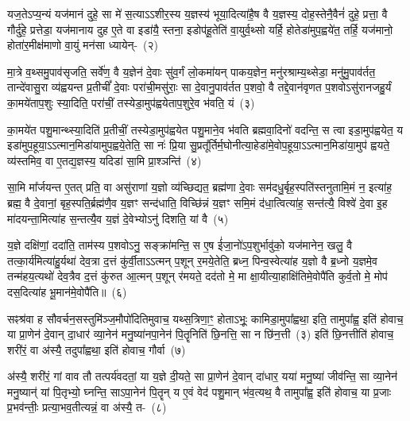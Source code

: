 यज॒ते\-ऽप्य॒न्यं यज॑मानं दुहे॒ सा मे॑ स॒त्या\-ऽऽ\-शीर॒स्य य॒ज्ञस्य॑ भूया॒दित्या॑है॒ष वै य॒ज्ञस्य॒ दोह॒स्तेनै॒वैनं॑ दुहे॒ प्रत्ता॒ वै गौर्दु॑हे॒ प्रत्तेडा॒ यज॑मानाय दुह ए॒ते वा इडा॑यै॒ स्तना॒ इडोप॑हू॒तेति॑ वा॒युर्व॒थ्सो यर्\mbox{}हि॒ होतेडा॑मुप॒ह्वये॑त॒ तर्\mbox{}हि॒ यज॑मानो॒ होता॑र॒मीक्ष॑माणो वा॒युं मन॑सा ध्यायेन्-~(२)

मा॒त्रे व॒थ्समु॒पाव॑सृजति॒ सर्वे॑ण॒ वै य॒ज्ञेन॑ दे॒वाः सु॑व॒र्गं लो॒कमा॑यन् पाकय॒ज्ञेन॒ मनु॑रश्राम्य॒थ्सेडा॒ मनु॑मु॒पाव॑र्तत॒ तान्दे॑वासु॒रा व्य॑ह्वयन्त प्र॒तीचीं᳚ दे॒वाः परा॑ची॒मसु॑राः॒ सा दे॒वानु॒पाव॑र्तत प॒शवो॒ वै तद्दे॒वान॑वृणत प॒शवो\-ऽसु॑रानजहु॒र्यं का॒मये॑ताप॒शुः स्या॒दिति॒ परा॑चीं॒ तस्येडा॒मुप॑ह्वयेताप॒शुरे॒व भ॑वति॒ यं~(३)

का॒मये॑त पशु॒मान्थ्स्या॒दिति॑ प्र॒तीचीं॒ तस्येडा॒मुप॑ह्वयेत पशु॒माने॒व भ॑वति ब्रह्मवा॒दिनो॑ वदन्ति॒ स त्वा इडा॒मुप॑ह्वयेत॒ य इडा॑मुप॒हूया॒\-ऽऽ\-त्मान॒मिडा॑यामुप॒ह्वये॒तेति॒ सा नः॑ प्रि॒या सु॒प्रतू᳚र्तिर्म॒घोनीत्या॒हेडा॑मे॒वोप॒हूया॒\-ऽऽ\-त्मान॒मिडा॑या॒मुप॑ ह्वयते॒ व्य॑स्तमिव॒ वा ए॒तद्य॒ज्ञस्य॒ यदिडा॑ सा॒मि प्रा॒श्ञन्ति॑~(४)

सा॒मि मा᳚र्जयन्त ए॒तत् प्रति॒ वा असु॑राणां य॒ज्ञो व्य॑च्छिद्यत॒ ब्रह्म॑णा दे॒वाः सम॑दधु॒र्बृह॒स्पति॑स्तनुतामि॒मं न॒ इत्या॑ह॒ ब्रह्म॒ वै दे॒वानां॒ बृह॒स्पति॒र्ब्रह्म॑णै॒व य॒ज्ञꣳ सन्द॑धाति॒ विच्छि॑न्नं य॒ज्ञꣳ समि॒मं द॑धा॒त्वित्या॑ह॒ सन्त॑त्यै॒ विश्वे॑ दे॒वा इ॒ह मा॑दयन्ता॒मित्या॑ह स॒न्तत्यै॒व य॒ज्ञं दे॒वेभ्यो\-ऽनु॑ दिशति॒ यां वै~(५)


य॒ज्ञे दक्षि॑णां॒ ददा॑ति॒ ताम॑स्य प॒शवो\-ऽनु॒ सङ्क्रा॑मन्ति॒ स ए॒ष ई॑जा॒नो॑\-ऽप॒शुर्भावु॑को॒ यज॑मानेन॒ खलु॒ वै तत्का॒र्य॑मित्या॑हु॒र्यथा॑ देव॒त्रा द॒त्तं कु॑र्वी॒ता\-ऽऽ\-त्मन् प॒शून् र॒मये॒तेति॒ ब्रध्न॒ पिन्व॒स्वेत्या॑ह य॒ज्ञो वै ब्र॒ध्नो य॒ज्ञमे॒व तन्म॑हय॒त्यथो॑ देव॒त्रैव द॒त्तं कु॑रुत आ॒त्मन् प॒शून् र॑मयते॒ दद॑तो मे॒ मा क्षा॒यीत्या॒हाक्षि॑तिमे॒वोपै॑ति कुर्व॒तो मे॒ मोप॑ दस॒दित्या॑ह भू॒मान॑मे॒वोपै॑ति॥~(६)

{\anuvakamend[{वि॒द्वान्ध्या॑ये॒ द्यं प्रा॒श्ञन्ति॒ यां वै म॒ एका॒न्नविꣳ॑श॒तिश्च॑}]}%

सꣴश्र॑वा ह सौवर्चन॒सस्तुमि॑ञ्ज॒मौपो॑दितिमुवाच॒ यथ्स॒त्रिणा॒ꣳ॒ होता\-ऽभूः॒ कामिडा॒मुपा᳚\-ह्वथा॒ इति॒ तामुपा᳚ह्व॒ इति॑ होवाच॒ या प्रा॒णेन॑ दे॒वान् दा॒धार॑ व्या॒नेन॑ मनु॒ष्या॑नपा॒नेन॑ पि॒तॄनिति॑ छि॒नत्ति॒ सा न छि॑न॒त्ती~(३) इति॑ छि॒नत्तीति॑ होवाच॒ शरी॑रं॒ वा अ॑स्यै॒ तदुपा᳚ह्वथा॒ इति॑ होवाच॒ गौर्वा~(७)

अ॑स्यै॒ शरी॑रं॒ गां वाव तौ तत्पर्य॑वदतां॒ या य॒ज्ञे दी॒यते॒ सा प्रा॒णेन॑ दे॒वान् दा॑धार॒ यया॑ मनु॒ष्या॑ जीव॑न्ति॒ सा व्या॒नेन॑ मनु॒ष्यान्॑ यां पि॒तृभ्यो॒ घ्नन्ति॒ सा\-ऽपा॒नेन॑ पि॒तॄन् य ए॒वं वेद॑ पशु॒मान् भ॑व॒त्यथ॒ वै तामुपा᳚ह्व॒ इति॑ होवाच॒ या प्र॒जाः प्र॒भव॑न्तीः॒ प्रत्या॒भव॒तीत्यन्नं॒ वा अ॑स्यै॒ त-~(८)

